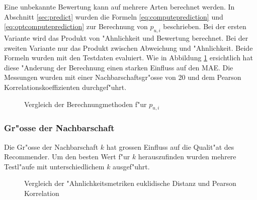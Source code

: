 \documentclass[a4paper, 12pt]{article}
\begin{document}
Eine unbekannte Bewertung kann auf mehrere Arten berechnet werden. In Abschnitt \ref{sec:predict} wurden die Formeln \ref{eq:computeprediction} und \ref{eq:optcomputeprediction} zur Berechnung  von $p_{u,i}$ beschrieben. Bei der ersten Variante wird das Produkt von "Ahnlichkeit und Bewertung berechnet. Bei der zweiten Variante nur das Produkt zwischen Abweichung und "Ahnlichkeit. Beide Formeln wurden mit den Testdaten evaluiert. Wie in Abbildung \ref{fig:predicteq} ersichtlich hat diese "Anderung der Berechnung einen starken Einfluss auf den MAE. Die Messungen wurden mit einer Nachbarschaftsgr"osse von 20 und dem Pearson Korrelationskoeffizienten durchgef"uhrt.

\begin{figure}
\centering
\label{fig:predicteq}
\caption{Vergleich der Berechnungmethoden f"ur $p_{u,i}$}
\end{figure}

\subsubsection{Gr"osse der Nachbarschaft}
\label{sec:neighborhoodsize}

Die Gr"osse der Nachbarschaft $k$ hat grossen Einfluss auf die Qualit"at des Recommender. Um den besten Wert f"ur $k$ herauszufinden wurden mehrere Testl"aufe mit unterschiedlichem $k$ ausgef"uhrt.

\begin{figure}
  \centering
{}

\caption{Vergleich der "Ahnlichkeitsmetriken euklidische Distanz und Pearson Korrelation}
\label{fig:nrofneighbors1}
\end{figure}
\end{document}
